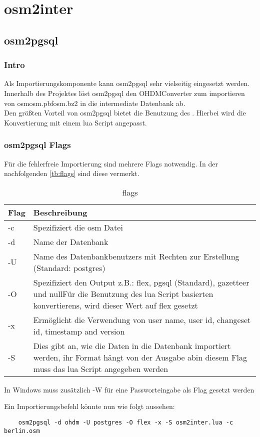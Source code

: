 \part{osm2inter}
\chapter{osm2pgsql}
\section{Intro}
Als Importierungskomponente kann osm2pgsql\cite{osm2pgsql-manual} sehr vielseitig eingesetzt werden. Innerhalb des Projektes löst osm2pgsql den OHDMConverter zum importieren von osm\textbar osm.pbf\textbar osm.bz2 in die intermediate Datenbank ab.\\

Den größten Vorteil von osm2pgsql bietet die Benutzung des . Hierbei wird die Konvertierung mit einem lua Script angepasst.

\section{osm2pgsql Flags}
Für die fehlerfreie Importierung sind mehrere Flags notwendig. In der nachfolgenden \autoref{tb:flags} sind diese vermerkt.
\begin{table}[h]
	\caption{flags}
	\label{tb:flags}
	\renewcommand{\arraystretch}{1.5}
	\begin{tabularx}{\linewidth}{|l|X|}\hline
		Flag & Beschreibung\\\hline
		-c & Spezifiziert die osm Datei\\\hline
		-d & Name der Datenbank \\\hline
		-U & Name des Datenbankbenutzers mit Rechten zur Erstellung (Standard: postgres)\\\hline
		-O & Spezifiziert den Output z.B.: flex, pgsql (Standard), gazetteer und null\newline Für die Benutzung des lua Script basierten konvertierens, wird dieser Wert auf flex gesetzt\\\hline
		-x & Ermöglicht die Verwendung von user name, user id, changeset id, timestamp and version\\\hline
		-S & Dies gibt an, wie die Daten in die Datenbank importiert werden, ihr Format hängt von der Ausgabe ab\newline in diesem Flag muss das lua Script angegeben werden\\\hline		
	\end{tabularx}\vspace{0.5cm}
In Windows muss zusätzlich -W für eine Passworteingabe als Flag gesetzt werden
\end{table}

Ein Importierungsbefehl könnte nun wie folgt aussehen:
\begin{lstlisting}
	osm2pgsql -d ohdm -U postgres -O flex -x -S osm2inter.lua -c berlin.osm
\end{lstlisting}
